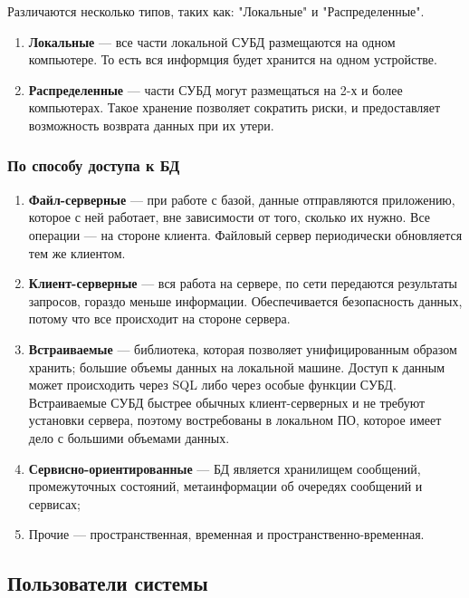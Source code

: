 Различаются несколько типов, таких как: "Локальные" и "Распределенные".

\begin{enumerate}[label=\arabic*.]
	\item \textbf{Локальные} --- все части локальной СУБД размещаются на одном компьютере. То есть вся информция будет хранится на одном устройстве.
	\item \textbf{Распределенные} --- части СУБД могут размещаться на 2-х и более компьютерах. Такое хранение позволяет сократить риски, и предоставляет возможность возврата данных при их утери. 
\end{enumerate}

\subsubsection{По способу доступа к БД}

\begin{enumerate}[label=\arabic*.]
	\item \textbf{Файл-серверные} --- при работе с базой, данные отправляются приложению, которое с ней работает, вне зависимости от того, сколько их нужно. Все операции --- на стороне клиента. Файловый сервер периодически обновляется тем же клиентом.
	\item \textbf{Клиент-серверные} --- вся работа на сервере, по сети передаются результаты запросов, гораздо меньше информации. Обеспечивается безопасность данных, потому что все происходит на стороне сервера.
	\item \textbf{Встраиваемые} --- библиотека, которая позволяет унифицированным образом хранить;
	большие объемы данных на локальной машине. Доступ к данным может происходить через SQL либо через 
	особые функции СУБД. Встраиваемые СУБД быстрее обычных клиент-серверных и не требуют установки
	сервера, поэтому востребованы в локальном ПО, которое имеет дело с большими объемами данных.
	\item \textbf{Сервисно-ориентированные} --- БД является хранилищем сообщений, промежуточных состояний, метаинформации об очередях сообщений и сервисах;
	\item Прочие --- пространственная, временная и пространственно-временная.
\end{enumerate}



\subsection{Пользователи системы}

